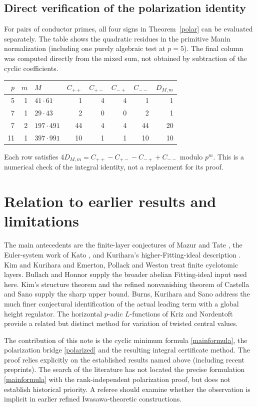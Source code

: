 \documentclass[11pt]{article}
\theoremstyle{remark}\newtheorem{remark}[theorem]{Remark}
\begin{document}
\subsection{Direct verification of the polarization identity}
For pairs of conductor primes, all four signs in Theorem~\ref{polar} can be evaluated separately. The table shows the quadratic residues in the primitive Manin normalization (including one purely algebraic test at $p=5$). The final column was computed directly from the mixed sum, not obtained by subtraction of the cyclic coefficients.
\begin{center}
\begin{tabular}{rrlrrrrr}
\toprule
$p$&$m$&$M$&$C_{++}$&$C_{+-}$&$C_{-+}$&$C_{--}$&$D_{M,m}$\\\midrule
5&1&$41\cdot61$&1&4&4&1&1\\
7&1&$29\cdot43$&2&0&0&2&1\\
7&2&$197\cdot491$&44&4&4&44&20\\
11&1&$397\cdot991$&10&1&1&10&10\\
\bottomrule
\end{tabular}
\end{center}
Each row satisfies $4D_{M,m}=C_{++}-C_{+-}-C_{-+}+C_{--}$ modulo $p^m$. This is a numerical check of the integral identity, not a replacement for its proof.

\section{Relation to earlier results and limitations}
The main antecedents are the finite-layer conjectures of Mazur and Tate \cite{MT}, the Euler-system work of Kato \cite{Kato}, and Kurihara's higher-Fitting-ideal description \cite{Kur}. Kim and Kurihara \cite{KK} and Emerton, Pollack and Weston \cite{EPW} treat finite cyclotomic layers. Bullach and Honnor \cite{BH} supply the broader abelian Fitting-ideal input used here. Kim's structure theorem \cite{Kim} and the refined nonvanishing theorem of Castella and Sano \cite{CS} supply the sharp upper bound. Burns, Kurihara and Sano \cite{BKS} address the much finer conjectural identification of the actual leading term with a global height regulator. The horizontal $p$-adic $L$-functions of Kriz and Nordentoft \cite{KN} provide a related but distinct method for variation of twisted central values.

The contribution of this note is the cyclic minimum formula \eqref{mainformula}, the polarization bridge \eqref{polarized} and the resulting integral certificate method. The proof relies explicitly on the established results named above (including recent preprints). The search of the literature has not located the precise formulation \eqref{mainformula} with the rank-independent polarization proof, but does not establish historical priority. A referee should examine whether the observation is implicit in earlier refined Iwasawa-theoretic constructions.
\end{document}
